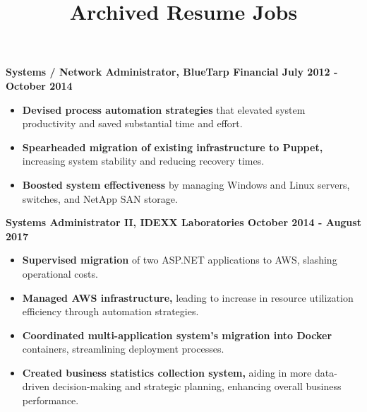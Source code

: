 \documentclass[10pt]{article}
\title{Archived Resume Jobs}
\date{}
\author{}
\makeatletter
\renewcommand{\maketitle}{\bgroup\setlength{\parindent}{0pt}
	\begin{flushleft}
		\LARGE\textbf{\@title}
		
		\normalsize\@author
	\end{flushleft}\egroup
}
\makeatother
\begin{document}
\maketitle
\thispagestyle{empty}

\noindent\textbf{Systems / Network Administrator, BlueTarp Financial \hfill{July 2012 - October 2014}}\\
\normalsize 
\begin{itemize}
\small
\item \textbf{Devised process automation strategies} that elevated system productivity and saved substantial time and effort.
\item \textbf{Spearheaded migration of existing infrastructure to Puppet,} increasing system stability and reducing recovery times.
\item \textbf{Boosted system effectiveness} by managing Windows and Linux servers, switches, and NetApp SAN storage.
\end{itemize}

\noindent\textbf{Systems Administrator II, IDEXX Laboratories \hfill{October 2014 - August 2017}}\\
\normalsize 
\begin{itemize}
\small
\item \textbf{Supervised migration} of two ASP.NET applications to AWS, slashing operational costs.
\item \textbf{Managed AWS infrastructure,} leading to increase in resource utilization efficiency through automation strategies.
\item \textbf{Coordinated multi-application system's migration into Docker} containers, streamlining deployment processes.
\item \textbf{Created business statistics collection system,} aiding in more data-driven decision-making and strategic planning,
enhancing overall business performance.
\end{itemize}

\normalsize
\end{document}
